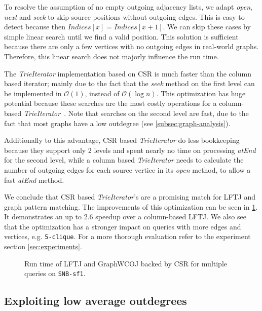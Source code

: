 To resolve the assumption of no empty outgoing adjacency lists, we adapt \textit{open}, \textit{next} and \textit{seek} to skip source
positions without outgoing edges.
This is easy to detect because then $Indices[x] = Indices[x + 1]$.
We can skip these cases by simple linear search until we find a valid position.
This solution is sufficient because there are only a few vertices with no outgoing edges in real-world graphs.
Therefore, this linear search does not majorly influence the run time.

The \textit{TrieIterator} implementation based on \textsc{CSR} is much faster than the column based iterator; mainly due to the fact
that the \textit{seek} method on the first level can be implemented in $\mathcal{O}(1)$, instead of $\mathcal{O}(\log n)$.
This optimization has huge potential because these searches are the most costly operations for a column-based
\textit{TrieIterator}~\cite{myria-detailed}.
Note that searches on the second level are fast, due to the fact that most graphs have a low outdegree (see
\cref{subsec:graph-analysis}).

Additionally to this advantage, \textsc{CSR} based \textit{TrieIterator} do less bookkeeping because they support only 2 levels and spent
nearly no time on processing \textit{atEnd} for the second level, while a column based \textit{TrieIterator} needs to calculate the
number of outgoing edges for each source vertice in its \textit{open} method, to allow a fast \textit{atEnd} method.

We conclude that \textsc{CSR} based \textit{TrieIterator}'s are a promising match for \textsc{LFTJ} and graph pattern matching.
The improvements of this optimization can be seen in \cref{fig:wcoj-vs-graphWCOJ}.
It demonstrates an up to 2.6 speedup over a column-based \textsc{LFTJ}. %
We also see that the optimization has a stronger impact on queries with more edges and vertices, e.g. \texttt{5-clique}.
For a more thorough evaluation refer to the experiment section \ref{sec:experiments}.

\begin{figure}
    \centering
    
    \caption{Run time of \textsc{LFTJ} and GraphWCOJ backed by \textsc{CSR} for multiple queries on \texttt{SNB-sf1}.}
    \label{fig:wcoj-vs-graphWCOJ}
\end{figure}

\subsection{Exploiting low average outdegrees} \label{subsec:graphWCOJ-materalization}

